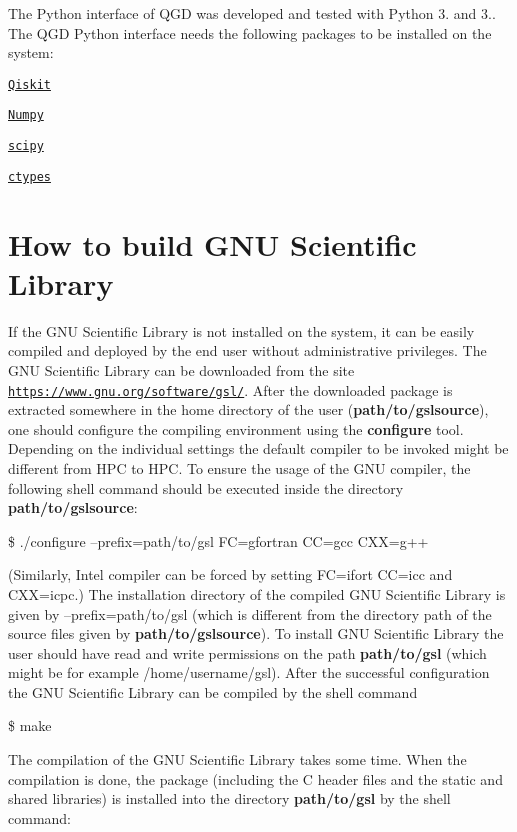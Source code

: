 The Python interface of Q\+GD was developed and tested with Python 3. and 3.. The Q\+GD Python interface needs the following packages to be installed on the system\+:


\begin{DoxyItemize}
\item \href{https://qiskit.org/documentation/install.html}{\tt Qiskit}
\item \href{https://numpy.org/install/}{\tt Numpy}
\item \href{https://www.scipy.org/install.html}{\tt scipy}
\item \href{https://docs.python.org/3/library/ctypes.html}{\tt ctypes}
\end{DoxyItemize}

\section*{How to build G\+NU Scientific Library}

If the G\+NU Scientific Library is not installed on the system, it can be easily compiled and deployed by the end user without administrative privileges. The G\+NU Scientific Library can be downloaded from the site \href{https://www.gnu.org/software/gsl/}{\tt https\+://www.\+gnu.\+org/software/gsl/}. After the downloaded package is extracted somewhere in the home directory of the user ({\bfseries path/to/gslsource}), one should configure the compiling environment using the {\bfseries configure} tool. Depending on the individual settings the default compiler to be invoked might be different from H\+PC to H\+PC. To ensure the usage of the G\+NU compiler, the following shell command should be executed inside the directory {\bfseries path/to/gslsource}\+:

\$ ./configure --prefix=path/to/gsl FC=gfortran CC=gcc C\+XX=g++

(Similarly, Intel compiler can be forced by setting FC=ifort CC=icc and C\+XX=icpc.) The installation directory of the compiled G\+NU Scientific Library is given by --prefix=path/to/gsl (which is different from the directory path of the source files given by {\bfseries path/to/gslsource}). To install G\+NU Scientific Library the user should have read and write permissions on the path {\bfseries path/to/gsl} (which might be for example /home/username/gsl). After the successful configuration the G\+NU Scientific Library can be compiled by the shell command

\$ make

The compilation of the G\+NU Scientific Library takes some time. When the compilation is done, the package (including the C header files and the static and shared libraries) is installed into the directory {\bfseries path/to/gsl} by the shell command\+:

